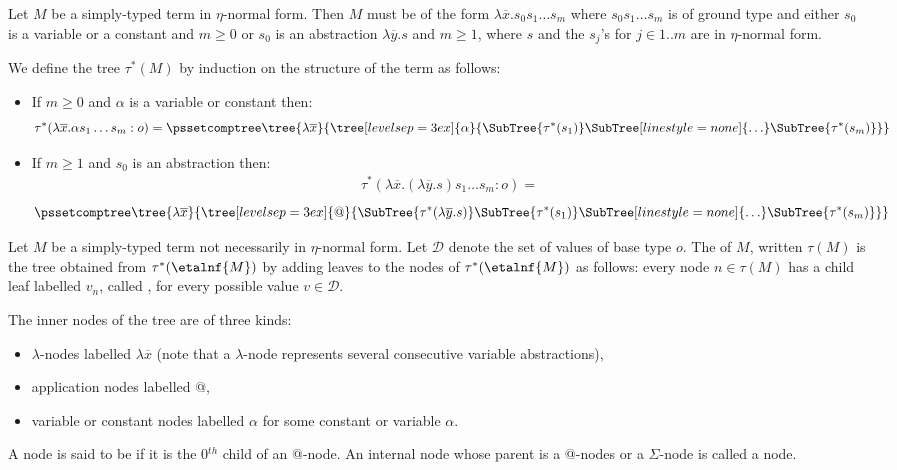 \begin{definition}
\label{dfn:comptree} Let $M$ be a simply-typed term in $\eta$-normal
form. Then $M$ must be of the form $\lambda \overline{x} . s_0 s_1
\ldots s_m$ where $s_0 s_1 \ldots s_m$ is of ground type and either
$s_0$ is a variable or a constant and $m\geq0$ or $s_0$ is an
abstraction $\lambda\overline{y}.s$ and $m\geq1$, where $s$ and the
$s_j$'s for $j\in 1..m$ are in $\eta$-normal form.

We define the tree $\tau^*(M)$ by induction on the structure of the
term as follows:
\begin{itemize}[-]
\item If $m\geq0$ and $\alpha$ is a variable or constant then:
$$ \tau^*( \lambda\overline{x} . \alpha s_1 \ldots s_m : o) =
    \pssetcomptree
    \tree{\lambda\overline{x}}
    {
        \tree[levelsep=3ex]{ \alpha }
            { \SubTree{\tau^*(s_1)} \SubTree[linestyle=none]{\ldots} \SubTree{\tau^*(s_m)}
            }
    }
$$

\item If $m \geq 1$ and $s_0$ is an abstraction then:
\begin{align*}
 \tau^*(\lambda\overline{x} . (\lambda\overline{y}.s) s_1 \ldots s_m : o)=
\end{align*}
$$\pssetcomptree\tree{\lambda\overline{x}} { \tree[levelsep=3ex]{
        @ } { \SubTree{\tau^*(\lambda\overline{y}.s)}
            \SubTree{\tau^*(s_1)}
            \SubTree[linestyle=none]{\ldots}
            \SubTree{\tau^*(s_m)} }}$$
\end{itemize}

Let $M$ be a simply-typed term not necessarily in $\eta$-normal
form. Let $\mathcal{D}$ denote the set of values of base type $o$.
The  of $M$, written $\tau(M)$ is the tree
obtained from $\tau^*(\etalnf{M})$ by adding leaves to the nodes of
$\tau^*(\etalnf{M})$ as follows: every node $n \in \tau(M)$ has a
child leaf labelled $v_n$, called , for every
possible value $v \in \mathcal{D}$.
\end{definition}

The inner nodes of the tree are of three kinds:
\begin{itemize}
\item $\lambda$-nodes labelled $\lambda \overline{x}$ (note that a $\lambda$-node represents several consecutive variable abstractions),
\item application nodes labelled @,
\item variable or constant nodes labelled $\alpha$ for some constant or variable $\alpha$.
\end{itemize}
A node is said to be  if it is the 0$^{th}$ child of an @-node.
An internal node whose parent is a @-nodes or a $\Sigma$-node is called a  node.
\bigskip

